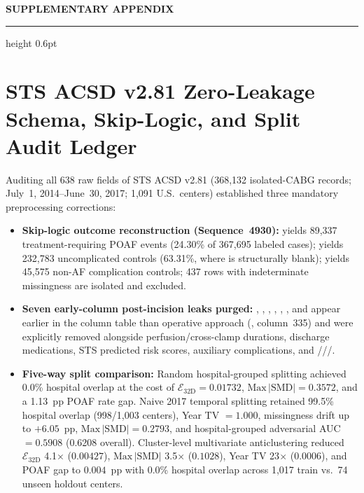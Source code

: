 \begin{center}
{\sffamily\bfseries\fontsize{13.5}{16.5}\selectfont\color{crimson}SUPPLEMENTARY APPENDIX\par}
\vspace{3pt}
{\sffamily\fontsize{10.0}{12.5}\selectfont\color{navy}\papertitle\par}
\vspace{4pt}
{\color{hair}\hrule height 0.6pt}
\end{center}
\vspace{6pt}

\section{STS ACSD v2.81 Zero-Leakage Schema, Skip-Logic, and Split Audit Ledger}
\label{supp:schema}
Auditing all 638 raw fields of STS ACSD v2.81 (368,132 isolated-CABG records; July~1, 2014--June~30, 2017; 1,091 U.S.\ centers) established three mandatory preprocessing corrections:
\begin{itemize}
  \item \textbf{Skip-logic outcome reconstruction (Sequence~4930):}  yields 89,337 treatment-requiring POAF events (24.30\% of 367,695 labeled cases);  yields 232,783 uncomplicated controls (63.31\%, where  is structurally blank);  yields 45,575 non-AF complication controls; 437 rows with indeterminate missingness are isolated and excluded.
  \item \textbf{Seven early-column post-incision leaks purged:} , , , , , , and  appear earlier in the column table than operative approach (, column~335) and were explicitly removed alongside perfusion/cross-clamp durations, discharge medications, STS predicted risk scores, auxiliary complications, and ///.
  \item \textbf{Five-way split comparison:} Random hospital-grouped splitting achieved 0.0\% hospital overlap at the cost of $\mathcal{E}_{32\mathrm{D}} = 0.01732$, $\mathrm{Max}\,|\mathrm{SMD}| = 0.3572$, and a 1.13~pp POAF rate gap. Naive 2017 temporal splitting retained 99.5\% hospital overlap (998/1,003 centers), Year TV $= 1.000$, missingness drift up to $+6.05$~pp, $\mathrm{Max}\,|\mathrm{SMD}| = 0.2793$, and hospital-grouped adversarial AUC $= 0.5908$ (0.6208 overall). Cluster-level multivariate anticlustering reduced $\mathcal{E}_{32\mathrm{D}}$ 4.1$\times$ ($0.00427$), $\mathrm{Max}\,|\mathrm{SMD}|$ 3.5$\times$ ($0.1028$), Year TV 23$\times$ ($0.0006$), and POAF gap to $0.004$~pp with 0.0\% hospital overlap across 1,017 train vs.\ 74 unseen holdout centers.
\end{itemize}

